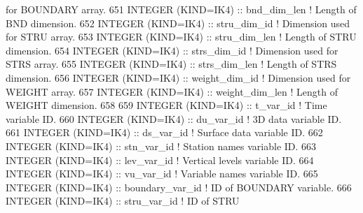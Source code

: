 \begin{DoxyCode}
{       for BOUNDARY array.}
651     \textcolor{keywordtype}{INTEGER (KIND=IK4)}          :: bnd\_dim\_len                                          \textcolor{comment}{! Length of BND
       dimension.}
652     \textcolor{keywordtype}{INTEGER (KIND=IK4)}          :: stru\_dim\_id                                          \textcolor{comment}{! Dimension used
       for STRU array.}
653     \textcolor{keywordtype}{INTEGER (KIND=IK4)}          :: stru\_dim\_len                                         \textcolor{comment}{! Length of STRU
       dimension.}
654     \textcolor{keywordtype}{INTEGER (KIND=IK4)}          :: strs\_dim\_id                                          \textcolor{comment}{! Dimension used
       for STRS array.}
655     \textcolor{keywordtype}{INTEGER (KIND=IK4)}          :: strs\_dim\_len                                         \textcolor{comment}{! Length of STRS
       dimension.}
656     \textcolor{keywordtype}{INTEGER (KIND=IK4)}          :: weight\_dim\_id                                        \textcolor{comment}{! Dimension used
       for WEIGHT array.}
657     \textcolor{keywordtype}{INTEGER (KIND=IK4)}          :: weight\_dim\_len                                       \textcolor{comment}{! Length of WEIGHT
       dimension.}
658 
659     \textcolor{keywordtype}{INTEGER (KIND=IK4)}          :: t\_var\_id                                             \textcolor{comment}{! Time variable ID.}
660     \textcolor{keywordtype}{INTEGER (KIND=IK4)}          :: du\_var\_id                                            \textcolor{comment}{! 3D data variable
       ID.}
661     \textcolor{keywordtype}{INTEGER (KIND=IK4)}          :: ds\_var\_id                                            \textcolor{comment}{! Surface data
       variable ID.}
662     \textcolor{keywordtype}{INTEGER (KIND=IK4)}          :: stn\_var\_id                                           \textcolor{comment}{! Station names
       variable ID.}
663     \textcolor{keywordtype}{INTEGER (KIND=IK4)}          :: lev\_var\_id                                           \textcolor{comment}{! Vertical levels
       variable ID.}
664     \textcolor{keywordtype}{INTEGER (KIND=IK4)}          :: vu\_var\_id                                            \textcolor{comment}{! Variable names
       variable ID.}
665     \textcolor{keywordtype}{INTEGER (KIND=IK4)}          :: boundary\_var\_id                                      \textcolor{comment}{! ID of BOUNDARY
       variable.}
666     \textcolor{keywordtype}{INTEGER (KIND=IK4)}          :: stru\_var\_id                                          \textcolor{comment}{! ID of STRU
}
\end{DoxyCode}
